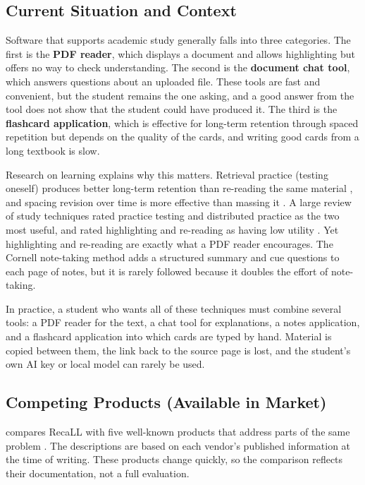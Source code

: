 \subsection{Current Situation and Context}

Software that supports academic study generally falls into three categories. The first
is the \textbf{PDF reader}, which displays a document and allows highlighting but offers
no way to check understanding. The second is the \textbf{document chat tool}, which
answers questions about an uploaded file. These tools are fast and convenient, but the
student remains the one asking, and a good answer from the tool does not show that the
student could have produced it. The third is the \textbf{flashcard application}, which is
effective for long-term retention through spaced repetition but depends on the quality of
the cards, and writing good cards from a long textbook is slow.

Research on learning explains why this matters. Retrieval practice (testing oneself)
produces better long-term retention than re-reading the same material
\cite{roediger2006}, and spacing revision over time is more effective than massing it
\cite{cepeda2006}. A large review of study techniques rated practice testing and
distributed practice as the two most useful, and rated highlighting and re-reading as
having low utility \cite{dunlosky2013}. Yet highlighting and re-reading are exactly what a
PDF reader encourages. The Cornell note-taking method \cite{pauk2011} adds a structured
summary and cue questions to each page of notes, but it is rarely followed because it
doubles the effort of note-taking.

In practice, a student who wants all of these techniques must combine several tools: a
PDF reader for the text, a chat tool for explanations, a notes application, and a
flashcard application into which cards are typed by hand. Material is copied between them,
the link back to the source page is lost, and the student's own AI key or local model can
rarely be used.

\subsection{Competing Products (Available in Market)}

 compares RecaLL with five well-known products that address parts of
the same problem \cite{notebooklm,chatpdf,anki,quizlet,remnote}. The descriptions are
based on each vendor's published information at the time of writing. These products change
quickly, so the comparison reflects their documentation, not a full evaluation.

